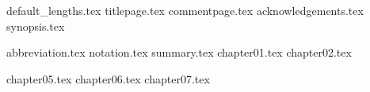 \documentclass{report}
\begin{document}
	{default_lengths.tex}
	{titlepage.tex}
	{commentpage.tex}
	{acknowledgements.tex}
	{synopsis.tex}
	\setcounter{tocdepth}{1}
	\hypertarget{tocpage}{}
	\renewcommand{\baselinestretch}{0.5}\normalsize
	\tableofcontents %
	\renewcommand{\baselinestretch}{1.0}\normalsize
	\newpage{}
	\listoffigures %
	\listoftables %
	\newpage
	{abbreviation.tex}
	{notation.tex}
	{summary.tex}
	{chapter01.tex}
	{chapter02.tex}

	
	{chapter05.tex}
	{chapter06.tex}
	{chapter07.tex}
	\nocite{ben_lynn_phd}
	\nocite{pbc}
	\nocite{sodium}
	\nocite{Washington:2008:ECN:1388394}
	\nocite{Martin:2008:IIE:1370962}
	\printbibliography
	\newpage
\end{document}
